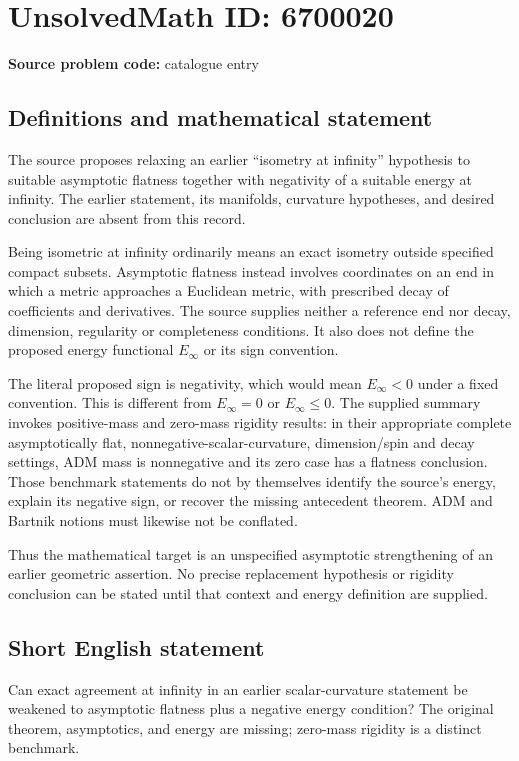 \documentclass[11pt]{article}
\begin{document}
\section*{UnsolvedMath ID: 6700020}
\textbf{Source problem code:} catalogue entry
\subsection{Definitions and mathematical statement}
The source proposes relaxing an earlier ``isometry at infinity'' hypothesis to suitable asymptotic flatness together with negativity of a suitable energy at infinity. The earlier statement, its manifolds, curvature hypotheses, and desired conclusion are absent from this record.

Being isometric at infinity ordinarily means an exact isometry outside specified compact subsets. Asymptotic flatness instead involves coordinates on an end in which a metric approaches a Euclidean metric, with prescribed decay of coefficients and derivatives. The source supplies neither a reference end nor decay, dimension, regularity or completeness conditions. It also does not define the proposed energy functional $E_\infty$ or its sign convention.

The literal proposed sign is negativity, which would mean $E_\infty<0$ under a fixed convention. This is different from $E_\infty=0$ or $E_\infty\leq0$. The supplied summary invokes positive-mass and zero-mass rigidity results: in their appropriate complete asymptotically flat, nonnegative-scalar-curvature, dimension/spin and decay settings, ADM mass is nonnegative and its zero case has a flatness conclusion. Those benchmark statements do not by themselves identify the source's energy, explain its negative sign, or recover the missing antecedent theorem. ADM and Bartnik notions must likewise not be conflated.

Thus the mathematical target is an unspecified asymptotic strengthening of an earlier geometric assertion. No precise replacement hypothesis or rigidity conclusion can be stated until that context and energy definition are supplied.
\subsection{Short English statement}
Can exact agreement at infinity in an earlier scalar-curvature statement be weakened to asymptotic flatness plus a negative energy condition? The original theorem, asymptotics, and energy are missing; zero-mass rigidity is a distinct benchmark.
\end{document}
